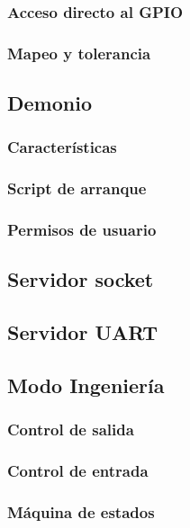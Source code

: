 \subsubsection{Acceso directo al GPIO}

\subsubsection{Mapeo y tolerancia}

\subsection{Demonio}

\subsubsection{Características}
\subsubsection{Script de arranque}
\subsubsection{Permisos de usuario}

\subsection{Servidor socket}

\subsection{Servidor UART}

\subsection{Modo Ingeniería}

\subsubsection{Control de salida}
\subsubsection{Control de entrada}
\subsubsection{Máquina de estados}

